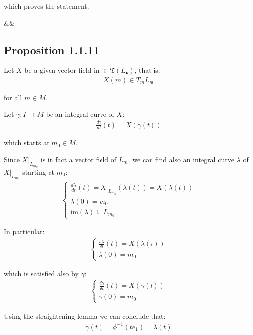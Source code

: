 				which proves the statement.

				\begin{flalign*}&&\square\end{flalign*}



		\subsection{Proposition 1.1.11}	
		Let $X$ be a given vector field in $\in \mathfrak{T}(L_\bullet)$, that is:
		\begin{align*}
			X(m) \in T_m L_m
		\end{align*}

		for all $m \in M$. \bigskip

		Let $\gamma : I \to M$ be an integral curve of $X$:
		\begin{align*}
			\frac{d \gamma}{dt}(t) = X(\gamma(t))
		\end{align*}

		which starts at $m_0 \in M$. \bigskip

		Since $X|_{L_{m_0}}$ is in fact a vector field of $L_{m_0}$ we can find also an integral curve $\lambda$ of $X|_{L_{m_0}}$ starting at $m_0$:
		\begin{align*}
			\begin{cases}
				\frac{d \lambda}{dt}(t) = X|_{L_{m_0}}(\lambda(t)) = X(\lambda(t)) \\
				\lambda(0) = m_0 \\
				\text{im}(\lambda) \subseteq L_{m_0}
			\end{cases}
		\end{align*}

		In particular:
		\begin{align*}
			\begin{cases}
				\frac{d \lambda}{dt}(t) = X(\lambda(t)) \\
				\lambda(0) = m_0
			\end{cases}
		\end{align*}

		which is satisfied also by $\gamma$:
		\begin{align*}
			\begin{cases}
				\frac{d \gamma}{dt}(t) = X(\gamma(t)) \\
				\gamma(0) = m_0
			\end{cases}	
		\end{align*}

		Using the straightening lemma we can conclude that:
		\begin{align*}
			\gamma(t) = \phi^{-1}(t e_1) = \lambda(t)
		\end{align*}

